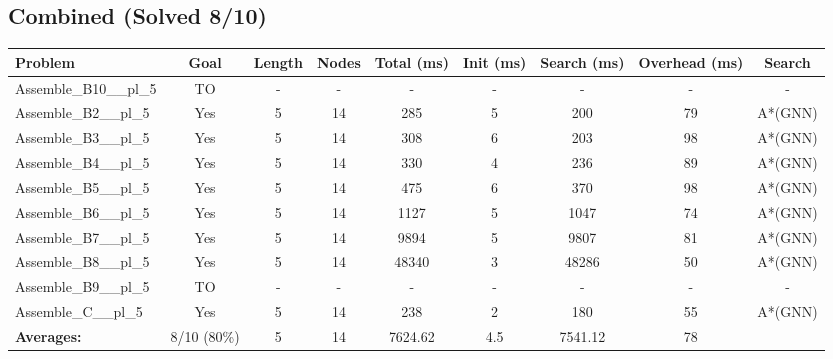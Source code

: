 \documentclass{article}
\begin{document}
\subsection*{Combined (Solved 8/10)}
\begin{tabular}{lcccccccc}
\toprule
Problem & Goal & Length & Nodes & Total (ms) & Init (ms) & Search (ms) & Overhead (ms) & Search \\
\midrule
Assemble\_B10\_\_pl\_5 & TO & - & - & - & - & - & - & - \\
Assemble\_B2\_\_pl\_5 & Yes & 5 & 14 & 285 & 5 & 200 & 79 & A*(GNN) \\
Assemble\_B3\_\_pl\_5 & Yes & 5 & 14 & 308 & 6 & 203 & 98 & A*(GNN) \\
Assemble\_B4\_\_pl\_5 & Yes & 5 & 14 & 330 & 4 & 236 & 89 & A*(GNN) \\
Assemble\_B5\_\_pl\_5 & Yes & 5 & 14 & 475 & 6 & 370 & 98 & A*(GNN) \\
Assemble\_B6\_\_pl\_5 & Yes & 5 & 14 & 1127 & 5 & 1047 & 74 & A*(GNN) \\
Assemble\_B7\_\_pl\_5 & Yes & 5 & 14 & 9894 & 5 & 9807 & 81 & A*(GNN) \\
Assemble\_B8\_\_pl\_5 & Yes & 5 & 14 & 48340 & 3 & 48286 & 50 & A*(GNN) \\
Assemble\_B9\_\_pl\_5 & TO & - & - & - & - & - & - & - \\
Assemble\_C\_\_pl\_5 & Yes & 5 & 14 & 238 & 2 & 180 & 55 & A*(GNN) \\
\textbf{Averages:} & 8/10 (80\%) & 5 & 14 & 7624.62 & 4.5 & 7541.12 & 78 & \\
\bottomrule
\end{tabular}
\\[0.7cm]
\end{document}
